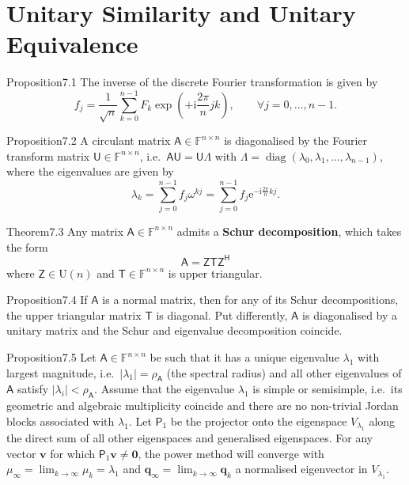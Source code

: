 \section{Unitary Similarity and Unitary Equivalence}

\begin{res}{Proposition}{7.1}
The inverse of the discrete Fourier transformation is given by
\begin{equation}f_j=\frac1{\sqrt n}\sum_{k=0}^{n-1}F_k\exp\left(+\mathrm i\frac{2\pi}{n}jk\right),\qquad\forall j=0,\dots,n-1.\tag{7.3}\end{equation}
\end{res}

\begin{res}{Proposition}{7.2}
A circulant matrix $\mathsf A\in\mathbb F^{n\times n}$ is diagonalised by the Fourier transform matrix $\mathsf U\in\mathbb F^{n\times n}$, i.e.\ $\mathsf{AU}=\mathsf{U\Lambda}$ with $\mathsf\Lambda=\operatorname{diag}(\lambda_0,\lambda_1,\dots,\lambda_{n-1})$, where the eigenvalues are given by
\begin{equation}\lambda_k=\sum_{j=0}^{n-1}f_j\omega^{kj}=\sum_{j=0}^{n-1}f_j\mathrm e^{-\mathrm i\frac{2\pi}{n}kj}.\tag{7.5}\end{equation}
\end{res}

\begin{res}{Theorem}{7.3}
Any matrix $\mathsf A\in\mathbb F^{n\times n}$ admits a \textbf{Schur decomposition}, which takes the form
\begin{equation}\mathsf A=\mathsf{ZTZ}^{\mathsf H}\tag{7.6}\end{equation}
where $\mathsf Z\in\mathrm U(n)$ and $\mathsf T\in\mathbb F^{n\times n}$ is upper triangular.
\end{res}

\begin{res}{Proposition}{7.4}
If $\mathsf A$ is a normal matrix, then for any of its Schur decompositions, the upper triangular matrix $\mathsf T$ is diagonal. Put differently, $\mathsf A$ is diagonalised by a unitary matrix and the Schur and eigenvalue decomposition coincide.
\end{res}

\begin{res}{Proposition}{7.5}
Let $\mathsf A\in\mathbb F^{n\times n}$ be such that it has a unique eigenvalue $\lambda_1$ with largest magnitude, i.e.\ $|\lambda_1|=\rho_{\mathsf A}$ (the spectral radius) and all other eigenvalues of $\mathsf A$ satisfy $|\lambda_i|<\rho_{\mathsf A}$. Assume that the eigenvalue $\lambda_1$ is simple or semisimple, i.e.\ its geometric and algebraic multiplicity coincide and there are no non-trivial Jordan blocks associated with $\lambda_1$. Let $\mathsf P_1$ be the projector onto the eigenspace $V_{\lambda_1}$ along the direct sum of all other eigenspaces and generalised eigenspaces. For any vector $\boldsymbol v$ for which $\mathsf P_1\boldsymbol v\ne\boldsymbol 0$, the power method will converge with $\mu_\infty=\lim_{k\to\infty}\mu_k=\lambda_1$ and $\boldsymbol q_\infty=\lim_{k\to\infty}\boldsymbol q_k$ a normalised eigenvector in $V_{\lambda_1}$.
\end{res}


